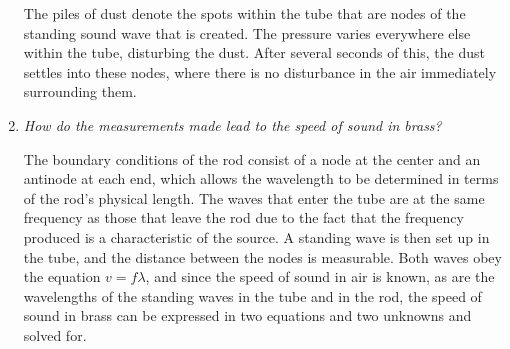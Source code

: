 \documentclass[twocolumn,english]{IEEEtran}
\theoremstyle{plain}
\theoremstyle{plain}
\begin{document}
\begin{enumerate}
 The piles of dust denote the spots within the tube that are nodes of the standing sound wave that is created. The pressure varies everywhere else within the tube, disturbing the dust. After several seconds of this, the dust settles into these nodes, where there is no disturbance in the air immediately surrounding them. \\

 \item \textit{How do the measurements made lead to the speed of sound in brass?}

 The boundary conditions of the rod consist of a node at the center and an antinode at each end, which allows the wavelength to be determined in terms of the rod's physical length. The waves that enter the tube are at the same frequency as those that leave the rod due to the fact that the frequency produced is a characteristic of the source. A standing wave is then set up in the tube, and the distance between the nodes is measurable. Both waves obey the equation $v=f\lambda$, and since the speed of sound in air is known, as are the wavelengths of the standing waves in the tube and in the rod, the speed of sound in brass can be expressed in two equations and two unknowns and solved for. \\
\end{enumerate}

\appendices{}



\end{document}
